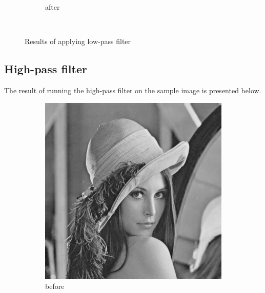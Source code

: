 \documentclass[12pt]{article}
\begin{document}
\begin{figure}[H]
\begin{subfigure}[t]{\subfiguresize}
        \caption{after}
    \end{subfigure}\\[1em]
    \caption{Results of applying low-pass filter}
\end{figure}   
\subsection{High-pass filter}
The result of running the high-pass filter on the sample image is presented below.
\begin{figure}[H]\centering
    \begin{subfigure}[t]{\subfiguresize}\centering
        \includegraphics[width=\textwidth]{img/lena.png}
        \caption{before}
    \end{subfigure}
    \hspace{2em}
    \begin{subfigure}[t]{\subfiguresize}\centering

\end{subfigure}
\end{figure}
\end{document}
